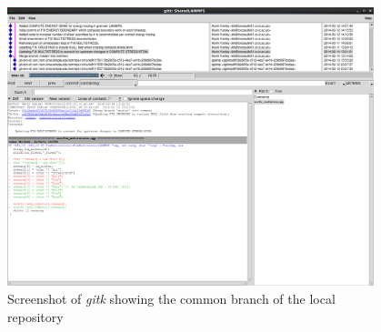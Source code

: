 \documentclass[a4paper,oneside,11pt]{article}
\begin{document}
\begin{figure}[h!]
  \centering
  \includegraphics[width=0.95\textwidth]{Screenshot-gitk.png}
  \caption{Screenshot of \emph{gitk} showing the common branch of the local repository}\label{fig:gitk}
\end{figure}
\end{document}
